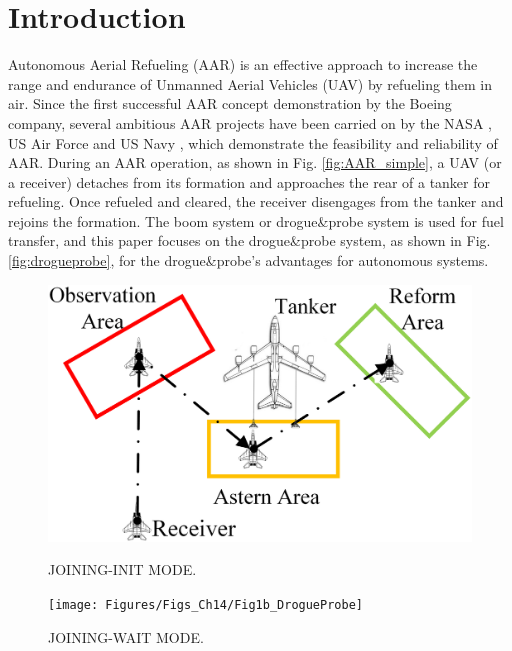 \section{Introduction}
Autonomous Aerial Refueling (AAR) is an effective approach to increase the range and endurance of Unmanned Aerial Vehicles (UAV) by refueling them in air. Since the first successful AAR concept demonstration by the Boeing company, several ambitious AAR projects have been carried on by the NASA \cite{dibley2007autonomous}, US Air Force and US Navy \cite{THOMAS201414}, which demonstrate the feasibility and reliability of AAR. During an AAR operation, as shown in Fig. \ref{fig:AAR_simple}, a UAV (or a receiver) detaches from its formation and approaches the rear of a tanker for refueling. Once refueled and cleared, the receiver disengages from the tanker and rejoins the formation. The boom system or drogue\&probe system is used for fuel transfer, and this paper focuses on the drogue\&probe system, as shown in Fig. \ref{fig:drogueprobe}, for the drogue\&probe's advantages for autonomous systems. \cite{bolkcom2006air, dibley2007autonomous}	
\begin{figure}[H]
	\begin{minipage}[t]{0.5\textwidth}
		\centering
		\includegraphics[scale=0.08]{Figures/Figs_Ch14/Fig1a_simpleAAR}
		\caption{JOINING-INIT MODE.\label{fig:AAR_simple}}
	\end{minipage}
	\qquad
	\begin{minipage}[t]{0.5\textwidth}
		\centering
		\texttt{[image: Figures/Figs\_Ch14/Fig1b\_DrogueProbe]}
		\caption{JOINING-WAIT MODE.\label{fig:drogueprobe}}
	\end{minipage}
	\label{Fig:joining}
\end{figure}

